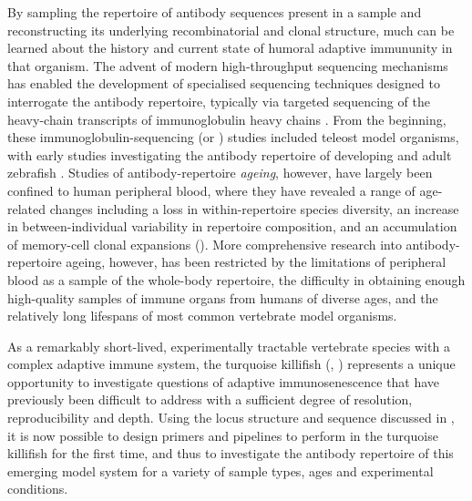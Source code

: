 By sampling the repertoire of antibody sequences present in a sample and reconstructing its underlying recombinatorial and clonal structure, much can be learned about the history and current state of humoral adaptive immununity in that organism.
The advent of modern high-throughput sequencing mechanisms has enabled the development of specialised sequencing techniques designed to interrogate the antibody repertoire, typically via targeted sequencing of the heavy-chain transcripts of immunoglobulin heavy chains \parencite{vollmers2013consensus,turchaninova2016igprep}. From the beginning, these immunoglobulin-sequencing (or \igseq) studies included teleost model organisms, with early \igseq studies investigating the antibody repertoire of developing and adult zebrafish \parencite{weinstein2009igseq,jiang2011determinism}. Studies of antibody-repertoire \textit{ageing}, however, have largely been confined to human peripheral blood, where they have revealed a range of age-related changes including a loss in within-repertoire species diversity, an increase in between-individual variability in repertoire composition, and an accumulation of memory-cell clonal expansions (). More comprehensive research into antibody-repertoire ageing, however, has been restricted by the limitations of peripheral blood as a sample of the whole-body repertoire, the difficulty in obtaining enough high-quality samples of immune organs from humans of diverse ages, and the relatively long lifespans of most common vertebrate model organisms. 

As a remarkably short-lived, experimentally tractable vertebrate species with a complex adaptive immune system, the turquoise killifish (\nfu, ) represents a unique opportunity to investigate questions of adaptive immunosenescence that have previously been difficult to address with a sufficient degree of resolution, reproducibility and depth. Using the \igh{} locus structure and sequence discussed in , it is now possible to design primers and pipelines to perform \igseq in the turquoise killifish for the first time, and thus to investigate the antibody repertoire of this emerging model system for a variety of sample types, ages and experimental conditions.

